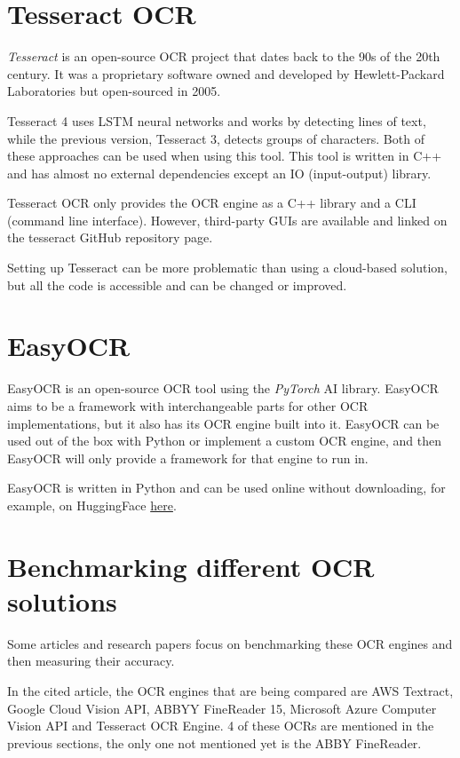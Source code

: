 \documentclass[
  digital,     %
  oneside,     %
  nosansbold,  %
  nocolorbold, %
  nolof,         %
  nolot,         %
]{fithesis4}
\begin{document}
\section{Tesseract OCR\cite{tesseract}}

\emph{Tesseract} is an open-source OCR project that dates back to the 90s of the 20th century. It was a proprietary software owned and developed by Hewlett-Packard Laboratories but open-sourced in 2005.

Tesseract 4 uses LSTM neural networks and works by detecting lines of text, while the previous version, Tesseract 3, detects groups of characters. Both of these approaches can be used when using this tool. This tool is written in C++ and has almost no external dependencies except an IO (input-output) library.

Tesseract OCR only provides the OCR engine as a C++ library and a CLI (command line interface). However, third-party GUIs are available and linked on the tesseract GitHub repository page.

Setting up Tesseract can be more problematic than using a cloud-based solution, but all the code is accessible and can be changed or improved.

\section{EasyOCR\cite{easyocr}}

EasyOCR is an open-source OCR tool using the \emph{PyTorch}\cite{pytorch} AI library. EasyOCR aims to be a framework with interchangeable parts for other OCR implementations, but it also has its OCR engine built into it. EasyOCR can be used out of the box with Python or implement a custom OCR engine, and then EasyOCR will only provide a framework for that engine to run in.

EasyOCR is written in Python and can be used online without downloading, for example, on HuggingFace \href{https://huggingface.co/spaces/tomofi/EasyOCR}{here}.

\section{Benchmarking different OCR solutions}

Some articles and research papers focus on benchmarking these OCR engines and then measuring their accuracy\cite{benchmark}.

In the cited article, the OCR engines that are being compared are AWS Textract\cite{awstextract}, Google Cloud Vision API\cite{googleapi}, ABBYY FineReader 15, Microsoft Azure Computer Vision API\cite{azurevision} and Tesseract OCR Engine\cite{tesseract}. 4 of these OCRs are mentioned in the previous sections, the only one not mentioned yet is the ABBY FineReader.
\end{document}
